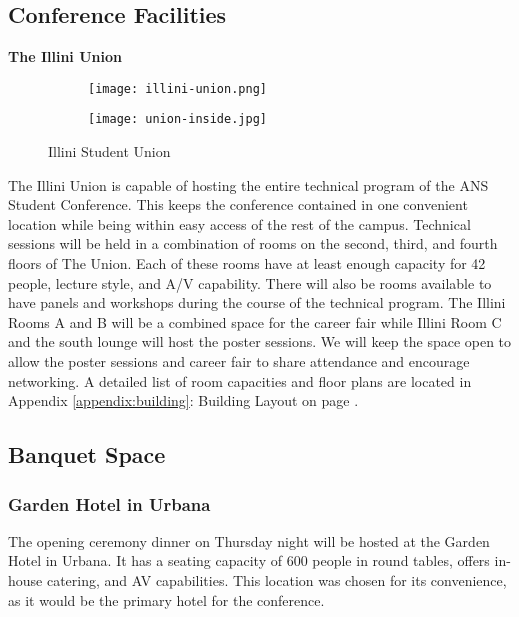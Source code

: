 \clearpage
\subsection{Conference Facilities}

\textbf{The Illini Union}\\

\begin{figure}[H]
	\centering
	\begin{subfigure}{0.5\textwidth}
		\centering
		\texttt{[image: illini-union.png]}
	\end{subfigure}%
	\begin{subfigure}{0.5\textwidth}
		\centering
		\texttt{[image: union-inside.jpg]}
	\end{subfigure}
	\caption{Illini Student Union}		
\end{figure} 


The Illini Union is capable of hosting the entire technical program of the ANS 
Student Conference. This keeps the conference contained in one convenient 
location while being within easy access of the rest of the campus. Technical 
sessions will be held in a combination of rooms on the second, third, and 
fourth floors of The Union. Each of these rooms have at least enough capacity 
for 42 people, lecture style, and A/V capability. There will also be rooms 
available to have panels and workshops during the course of the technical 
program. The Illini Rooms A and B will be a combined space for the career fair 
while Illini Room C and the south lounge will host the poster sessions. We will 
keep the space open to allow the poster sessions and career fair to share 
attendance and encourage networking. A detailed list of room capacities and 
floor plans are located in Appendix \ref{appendix:building}: Building Layout on 
page \pageref{appendix:building}. \\


\subsection{Banquet Space}
\subsubsection{Garden Hotel in Urbana}
The opening ceremony dinner on Thursday night will be hosted at the Garden Hotel in Urbana. It has a seating capacity of 600 people in round tables, offers in-house catering, and AV capabilities. This location was chosen for its convenience, as it would be the primary hotel for the conference. 


